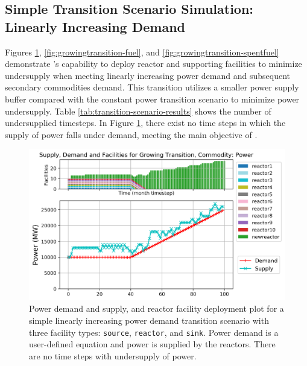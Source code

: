    \subsection{Simple Transition Scenario Simulation: Linearly Increasing Demand}

    Figures \ref{fig:growingtransition-power}, \ref{fig:growingtransition-fuel},
    and \ref{fig:growingtransition-spentfuel} demonstrate \deploy's capability 
    to deploy reactor and supporting facilities to minimize undersupply 
    when meeting linearly increasing power demand and subsequent secondary 
    commodities demand. 
    This transition utilizes a smaller power supply buffer compared with the constant 
    power transition scenario to minimize power undersupply.
    Table \ref{tab:transition-scenario-results} shows the number of 
    undersupplied timesteps. 
    In Figure \ref{fig:growingtransition-power}, there exist no time steps 
    in which the supply of power falls under demand, meeting the main 
    objective of \deploy. 
    
    \begin{figure}[]
        \centering
        \includegraphics[width=0.8\linewidth]{figures/growingtransition-power.png} 
            \caption{Power demand and supply, and reactor facility deployment plot for  
            a simple linearly increasing power demand transition scenario with 
            three facility types: \texttt{source}, \texttt{reactor}, and \texttt{sink}.
            Power demand is a user-defined equation and power is supplied by the reactors.
            There are no time steps with undersupply of power.}
            \label{fig:growingtransition-power}
    \end{figure}
    
